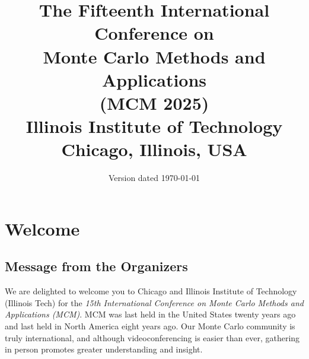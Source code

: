 \documentclass[12pt,lettersize,oneside]{book} %
\begin{document}

\title{The Fifteenth International Conference on \\
	Monte Carlo Methods and Applications \\
	(MCM 2025) \\[3ex]
	\Large{Illinois Institute of Technology} \\
	\large{Chicago, Illinois, USA}}
\date{Version dated \today}
\maketitle


\tableofcontents


\chapter{Welcome}

\section{Message from the Organizers} \label{org_com}


We are delighted to welcome you to Chicago and Illinois Institute of Technology (Illinois Tech) for the \emph{15th International Conference on Monte Carlo Methods and Applications (MCM)}. MCM was last held in the United States twenty years ago and last held in North America eight years ago.  Our Monte Carlo community is truly international, and although videoconferencing is easier than ever, gathering in person promotes greater understanding and insight.
\end{document}

